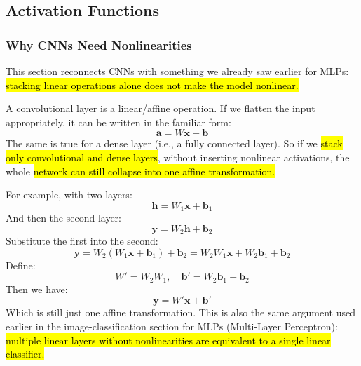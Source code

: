 \subsection{Activation Functions}\label{sec:activation-functions-in-cnns}

\subsubsection{Why CNNs Need Nonlinearities}

This section reconnects CNNs with something we already saw earlier for MLPs: \hl{stacking linear operations alone does not make the model nonlinear.}

\highspace
A convolutional layer is a linear/affine operation. If we flatten the input appropriately, it can be written in the familiar form:
\begin{equation*}
    \mathbf{a} = W\mathbf{x} + \mathbf{b}
\end{equation*}
The same is true for a dense layer (i.e., a fully connected layer). So if we \hl{stack only convolutional and dense layers}, without inserting nonlinear activations, the whole \hl{network can still collapse into one affine transformation.}

\highspace
For example, with two layers:
\begin{equation*}
    \mathbf{h} = W_1 \mathbf{x} + \mathbf{b}_1
\end{equation*}
And then the second layer:
\begin{equation*}
    \mathbf{y} = W_2 \mathbf{h} + \mathbf{b}_2
\end{equation*}
Substitute the first into the second:
\begin{equation*}
    \mathbf{y} = W_2 \left( W_1 \mathbf{x} + \mathbf{b}_1 \right) + \mathbf{b}_2 = W_2 W_1 \mathbf{x} + W_2 \mathbf{b}_1 + \mathbf{b}_2
\end{equation*}
Define:
\begin{equation*}
    W' = W_2 W_1, \quad \mathbf{b}' = W_2 \mathbf{b}_1 + \mathbf{b}_2
\end{equation*}
Then we have:
\begin{equation}
    \mathbf{y} = W' \mathbf{x} + \mathbf{b}'
\end{equation}
Which is still just one affine transformation. This is also the same argument used earlier in the image-classification section for MLPs (Multi-Layer Perceptron): \hl{multiple linear layers without nonlinearities are equivalent to a single linear classifier.}

